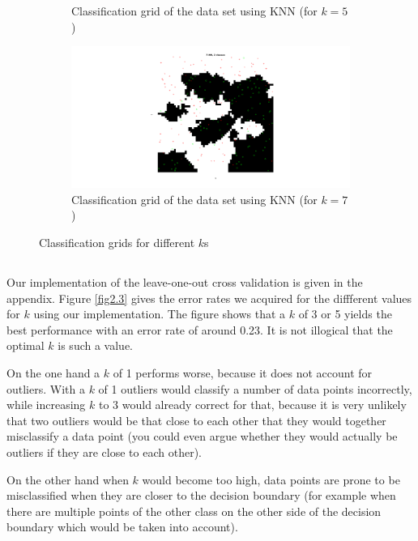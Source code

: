 \documentclass[10pt]{article}
\begin{document}
\begin{figure}[H]
\begin{subfigure}{.48\textwidth}
    \caption{Classification grid of the data set using KNN (for $k=5$)}
    \label{fig2.1c}
  \end{subfigure}
  \begin{subfigure}{.48\textwidth}
    \includegraphics[width=1\textwidth]{assign2_2_7.png}
    \caption{Classification grid of the data set using KNN (for $k=7$)}
    \label{fig2.1d}
  \end{subfigure}
  \caption{Classification grids for different $k$s}
  \label{fig2.1}
\end{figure}

\subsection{}
Our implementation of the leave-one-out cross validation is given in the appendix. Figure \ref{fig2.3} gives the error rates we acquired for the diffferent values for $k$ using our implementation. The figure shows that a $k$ of 3 or 5 yields the best performance with an error rate of around 0.23. It is not illogical that the optimal $k$ is such a value. 

On the one hand a $k$ of 1 performs worse, because it does not account for outliers. With a $k$ of 1 outliers would classify a number of data points incorrectly, while increasing $k$ to 3 would already correct for that, because it is very unlikely that two outliers would be that close to each other that they would together misclassify a data point (you could even argue whether they would actually be outliers if they are close to each other). 

On the other hand when $k$ would become too high, data points are prone to be misclassified when they are closer to the decision boundary (for example when there are multiple points of the other class on the other side of the decision boundary which would be taken into account).
\end{document}
